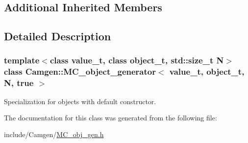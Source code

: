 \subsection*{Additional Inherited Members}


\subsection{Detailed Description}
\subsubsection*{template$<$class value\-\_\-t, class object\-\_\-t, std\-::size\-\_\-t N$>$class Camgen\-::\-M\-C\-\_\-object\-\_\-generator$<$ value\-\_\-t, object\-\_\-t, N, true $>$}

Specialization for objects with default constructor. 

The documentation for this class was generated from the following file\-:\begin{DoxyCompactItemize}
\item 
include/\-Camgen/\hyperlink{a00673}{M\-C\-\_\-obj\-\_\-gen.\-h}\end{DoxyCompactItemize}
